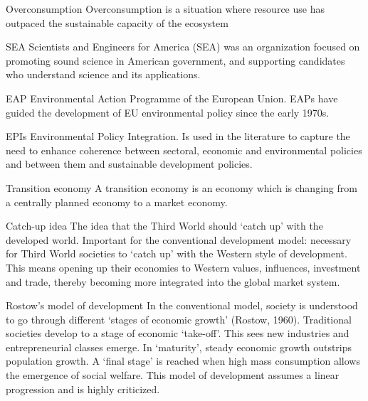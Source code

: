 \begin{sortEnvironment}{Overconsumption}
Overconsumption is a situation where resource use has outpaced the sustainable capacity of the ecosystem
\end{sortEnvironment}

\begin{sortEnvironment}{SEA}
Scientists and Engineers for America (SEA) was an organization focused on promoting sound science in American government, and supporting candidates who understand science and its applications.
\end{sortEnvironment}

\begin{sortEnvironment}{EAP}
Environmental Action Programme of the European Union. EAPs have guided the development of EU environmental policy since the early 1970s. 
\end{sortEnvironment}

\begin{sortEnvironment}{EPIs}
Environmental Policy Integration. Is used in the literature to capture the need to enhance coherence between sectoral, economic and environmental policies and between them and sustainable development policies.
\end{sortEnvironment}

\begin{sortEnvironment}{Transition economy}
A transition economy is an economy which is changing from a centrally planned economy to a market economy.
\end{sortEnvironment}

\begin{sortEnvironment}{Catch-up idea}
The idea that the Third World should ‘catch up’ with the developed world. Important for the conventional development model: necessary for Third World societies to ‘catch up’ with the Western style of development. This means opening up their economies to Western values,
influences, investment and trade, thereby becoming more integrated into the global market system.
\end{sortEnvironment}

\begin{sortEnvironment}{Rostow's model of development}
In the conventional model, society is understood to go through different ‘stages of economic growth’ (Rostow, 1960). Traditional societies develop to a stage of economic ‘take-off’. This sees new industries and entrepreneurial classes emerge. In ‘maturity’, steady economic growth outstrips population growth. A ‘final stage’ is reached when high mass consumption allows the emergence of social welfare. This model of development assumes a linear progression and is highly criticized.  
\end{sortEnvironment}


